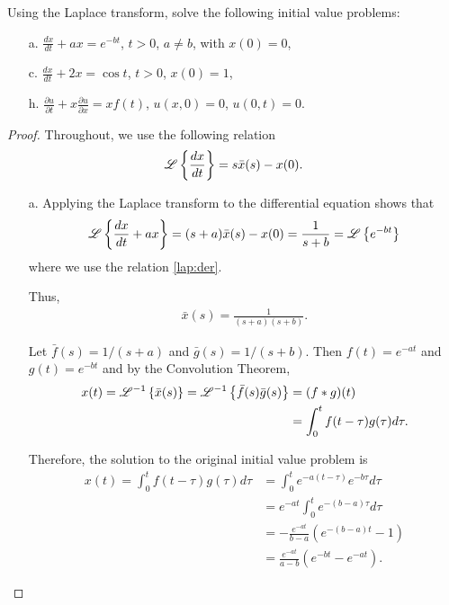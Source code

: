 \begin{problem}{4.1}
  Using the Laplace transform, solve the following initial value problems:
  \begin{enumerate}
    \item[a.] $\displaystyle \frac{dx}{dt} + ax = e^{-bt}$, $t >0$, $a\neq b$, with $x(0) = 0$,
    \item[c.] $\displaystyle \frac{dx}{dt} + 2x = \cos t$, $t > 0$, $x(0)= 1$,
    \item[h.] $\displaystyle \frac{\partial u}{\partial t} + x\frac{\partial u}{\partial x} = x f(t)$, $u(x,0)= 0$, $u(0, t) = 0$.
  \end{enumerate}
\end{problem}

\begin{proof}
  Throughout, we use the following relation
  \begin{align}\label{lap:der}
    \mathscr{L}\left\{ {\frac{dx}{dt}} \right\} = s\bar{x}(s) - x(0).
  \end{align}

  \begin{enumerate}
    \item[a.] Applying the Laplace transform to the differential equation shows that
      \begin{align*}
        \mathscr{L}\left\{ {\frac{dx}{dt} + ax} \right\} = (s+a)\bar{x}(s) - x(0) = \frac{1}{s+b} = \mathscr{L}\left\{ {e^{-bt}} \right\}
      \end{align*}
      where we use the relation \eqref{lap:der}.

      Thus,
      \begin{align*}
        \bar{x}(s) = \frac{1}{(s+a)(s+b)}.
      \end{align*}

      Let $\bar{f}(s) = 1/(s+a)$ and $\bar{g}(s) = 1/(s+b)$.
      Then $f(t) = e^{-at}$ and $g(t) = e^{-bt}$ and by the Convolution Theorem,
      \begin{align*}
        x(t) = \mathscr{L}^{-1}\left\{ {\bar{x}(s)} \right\} = \mathscr{L}^{-1}\left\{ {\bar{f}(s)\bar{g}(s)} \right\} &= (f\ast g)(t) \\
        &= \int_0^t f(t-\tau) g(\tau) d\tau.
      \end{align*}

      Therefore, the solution to the original initial value problem is
      \begin{align*}
        x(t) = \int_0^t f(t-\tau) g(\tau) d\tau &= \int_0^t e^{-a(t-\tau)} e^{-b\tau} d\tau \\
        &= e^{-at} \int_0^t e^{-(b-a)\tau} d\tau \\
        &= -\frac{e^{-at}}{b-a}\left(e^{-(b-a)t} - 1\right) \\
        &= \frac{e^{-at}}{a-b}\left(e^{-bt} - e^{-at}\right).
      \end{align*}


\end{enumerate}
\end{proof}
